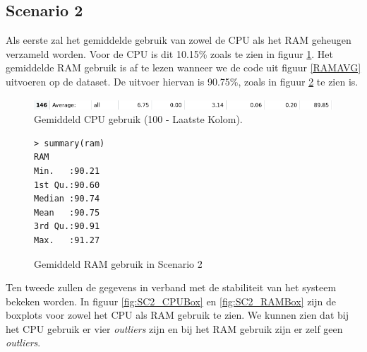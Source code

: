 
\clearpage
\subsection{Scenario 2}
Als eerste zal het gemiddelde gebruik van zowel de CPU als het RAM geheugen verzameld worden. Voor de CPU is dit 10.15\% zoals te zien in figuur \ref{fig:SC2_CPUAVG}. Het gemiddelde RAM gebruik is af te lezen wanneer we de code uit figuur \ref{RAMAVG} uitvoeren op de dataset. De uitvoer hiervan is 90.75\%, zoals in figuur \ref{SC2_RAMAVG} te zien is.
\begin{figure}[h]
	\centering
	\includegraphics[width=\linewidth]{img/SC2_CPUAVG.png}
	\caption{Gemiddeld CPU gebruik (100 - Laatste Kolom).}
	\label{fig:SC2_CPUAVG}
\end{figure}
\begin{figure}[h]
	\centering
	\begin{verbatim} 
> summary(ram)
RAM       
Min.   :90.21  
1st Qu.:90.60  
Median :90.74  
Mean   :90.75  
3rd Qu.:90.91  
Max.   :91.27  
	\end{verbatim}
	\caption{Gemiddeld RAM gebruik in Scenario 2}
	\label{SC2_RAMAVG}
\end{figure}

Ten tweede zullen de gegevens in verband met de stabiliteit van het systeem bekeken worden. In figuur \ref{fig:SC2_CPUBox} en \ref{fig:SC2_RAMBox} zijn de boxplots voor zowel het CPU als RAM gebruik te zien. We kunnen zien dat bij het CPU gebruik er vier \textit{outliers} zijn en bij het RAM gebruik zijn er zelf geen \textit{outliers}. 

